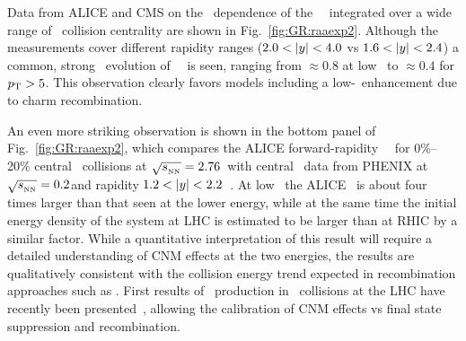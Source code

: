 Data from ALICE and CMS on the \pT\ dependence of the \jpsi\ \Raa\ integrated over a wide range of \PbPb\ collision centrality
are shown in Fig.~\ref{fig:GR:raaexp2}. Although the measurements
cover different rapidity ranges ($2.0 < |y| < 4.0$ vs $ 1.6  < |y| < 2.4 $)
a common, strong \pT\ evolution of \jpsi\ \Raa\ is seen, ranging from $\approx 0.8$ at low \pT\ to $\approx 0.4$ for $\mbox{$p_{\mathrm{T}}$} > 5$\GeVc.
This observation clearly favors models including a low-\pT\ enhancement due to charm recombination.

An even more striking observation is shown in the bottom panel of Fig.~\ref{fig:GR:raaexp2}, which compares
the ALICE forward-rapidity \jpsi\ \Raa\ for 0\%--20\% central \PbPb\ collisions at  $\sqrt{s_{_{\rm NN}}} = 2.76$\TeV\
with central \AuAu\ data from PHENIX at $\sqrt{s_{_{\rm NN}}} = 0.2$\GeV and rapidity $1.2 < |y| < 2.2$~\cite{Adare:2011yf}.
At low \pT\ the ALICE \Raa\ is about four times larger than that seen at the lower energy, while
at the same time the initial energy density of the system at LHC is estimated to be larger than at
RHIC by a similar factor. While a quantitative interpretation of this result will require
a detailed understanding of CNM effects at the two energies, the results are qualitatively consistent
with the collision energy trend expected in recombination approaches such as
\cite{Zhao:2007hh,Zhou:2013aea,Liu:2009nb}.
First results of \jpsi\ production in \pPb\ collisions at the LHC have recently
been presented~\cite{Abelev:2013yxa,Aaij:2013zxa}, allowing
the calibration of CNM effects vs final state suppression and recombination.

